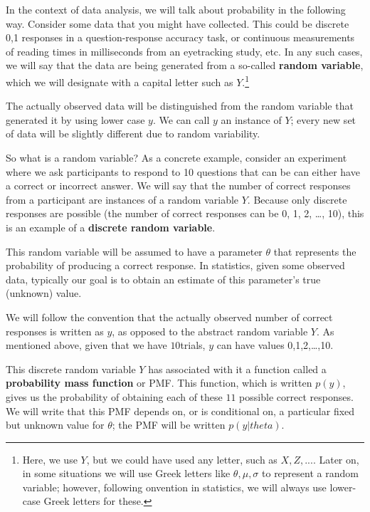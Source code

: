\documentclass[12pt,]{krantz}
\begin{document}
In the context of data analysis, we will talk about probability in the following way. Consider some data that you might have collected. This could be discrete 0,1 responses in a question-response accuracy task, or continuous measurements of reading times in milliseconds from an eyetracking study, etc. In any such cases, we will say that the data are being generated from a so-called \textbf{random variable}, which we will designate with a capital letter such as \(Y\).\footnote{Here, we use \(Y\), but we could have used any letter, such as \(X, Z,...\). Later on, in some situations we will use Greek letters like \(\theta, \mu, \sigma\) to represent a random variable; however, following onvention in statistics, we will always use lower-case Greek letters for these.}

The actually observed data will be distinguished from the random variable that generated it by using lower case \(y\). We can call \(y\) an instance of \(Y\); every new set of data will be slightly different due to random variability.

So what is a random variable? As a concrete example, consider an experiment where we ask participants to respond to 10 questions that can be can either have a correct or incorrect answer. We will say that the number of correct responses from a participant are instances of a random variable \(Y\). Because only discrete responses are possible (the number of correct responses can be 0, 1, 2, \ldots{}, 10), this is an example of a \textbf{discrete random variable}.

This random variable will be assumed to have a parameter \(\theta\) that represents the probability of producing a correct response. In statistics, given some observed data, typically our goal is to obtain an estimate of this parameter's true (unknown) value.

We will follow the convention that the actually observed number of correct responses is written as \(y\), as opposed to the abstract random variable \(Y\). As mentioned above, given that we have \(10\)trials, \(y\) can have values 0,1,2,\ldots{},10.

This discrete random variable \(Y\) has associated with it a function called a \textbf{probability mass function} or PMF. This function, which is written \(p(y)\), gives us the probability of obtaining each of these \(11\) possible correct responses. We will write that this PMF depends on, or is conditional on, a particular fixed but unknown value for \(\theta\); the PMF will be written \(p(y|theta)\).
\end{document}
